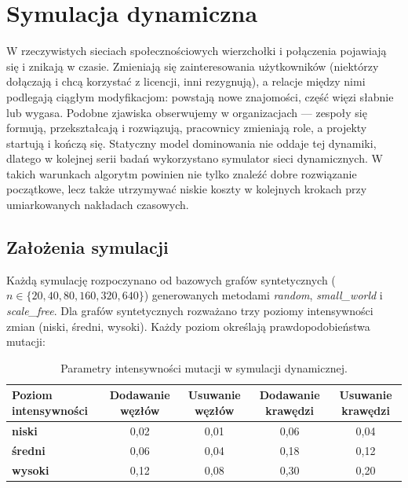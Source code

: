 \chapter{Symulacja dynamiczna}\label{chap:dynamic}

W rzeczywistych sieciach społecznościowych wierzchołki i połączenia pojawiają się i znikają w czasie. Zmieniają się zainteresowania użytkowników (niektórzy dołączają i chcą korzystać z licencji, inni rezygnują), a relacje między nimi podlegają ciągłym modyfikacjom: powstają nowe znajomości, część więzi słabnie lub wygasa. Podobne zjawiska obserwujemy w organizacjach — zespoły się formują, przekształcają i rozwiązują, pracownicy zmieniają role, a projekty startują i kończą się. Statyczny model dominowania nie oddaje tej dynamiki, dlatego w kolejnej serii badań wykorzystano symulator sieci dynamicznych. W takich warunkach algorytm powinien nie tylko znaleźć dobre rozwiązanie początkowe, lecz także utrzymywać niskie koszty w kolejnych krokach przy umiarkowanych nakładach czasowych.

\section{Założenia symulacji}

Każdą symulację rozpoczynano od bazowych grafów syntetycznych ($n\in\{20,40,80,160,320,640\}$) generowanych metodami \emph{random}, \emph{small\_world} i \emph{scale\_free}. Dla grafów syntetycznych rozważano trzy poziomy intensywności zmian (niski, średni, wysoki). Każdy poziom określają prawdopodobieństwa mutacji:

\begin{table}[H]
  \centering
  \begin{tabular}{|l|c|c|c|c|}
    \hline
    \textbf{Poziom intensywności} & \textbf{Dodawanie węzłów} & \textbf{Usuwanie węzłów} & \textbf{Dodawanie krawędzi} & \textbf{Usuwanie krawędzi} \\
    \hline
    \textbf{niski}                & 0,02                      & 0,01                     & 0,06                        & 0,04                       \\
    \textbf{średni}               & 0,06                      & 0,04                     & 0,18                        & 0,12                       \\
    \textbf{wysoki}               & 0,12                      & 0,08                     & 0,30                        & 0,20                       \\
    \hline
  \end{tabular}
  \caption{Parametry intensywności mutacji w symulacji dynamicznej.}
  \label{tab:mutation_params}
\end{table}

